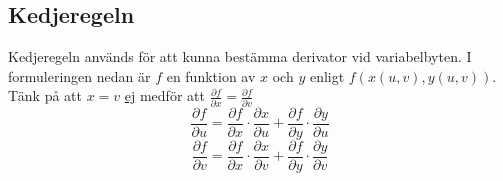 \documentclass[10pt,a4paper]{article}
\begin{document}
\subsection{Kedjeregeln}
Kedjeregeln används för att kunna bestämma derivator vid variabelbyten. I formuleringen nedan är $f$ en funktion av $x$ och $y$ enligt $f(x(u,v),y(u,v))$. Tänk på att $x=v$ \underline{ej} medför att $\frac{\partial f}{\partial x} = \frac{\partial f}{\partial v}$
\begin{equation}
\frac{\partial f}{\partial u}=\frac{\partial f}{\partial x}\cdot \frac{\partial x}{\partial u} + \frac{\partial f}{\partial y} \cdot \frac{\partial y}{\partial u}
\end{equation}
\begin{equation}
\frac{\partial f}{\partial v}=\frac{\partial f}{\partial x}\cdot \frac{\partial x}{\partial v} + \frac{\partial f}{\partial y} \cdot \frac{\partial y}{\partial v}
\end{equation}
\end{document}
